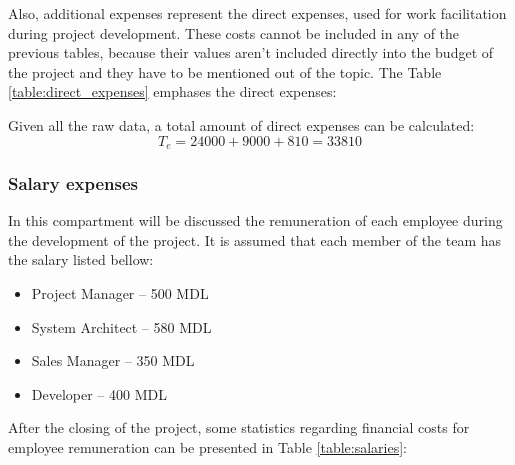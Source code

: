 Also, additional expenses represent the direct expenses, used for work facilitation during project development. These costs cannot be included in any of the previous tables, because their values aren't included directly into the budget of the project and they have to be mentioned out of the topic. The Table \ref{table:direct_expenses} emphases the direct expenses:

\begin{table}[H]
\centering
\caption{Direct expenses}
\label{table:direct_expenses}
\end{table}

Given all the raw data, a total amount of direct expenses can be calculated: 
\begin{equation}
 T_{e} = 24000 + 9000 + 810 = 33810
\end{equation}

\subsubsection{Salary expenses}
In this compartment will be discussed the remuneration of each employee during the development of the project. It is assumed that each member of the team has the salary listed bellow:

\begin{itemize}
\item Project Manager – 500 MDL
\item System Architect – 580 MDL
\item Sales Manager – 350 MDL
\item Developer – 400 MDL
\end{itemize}

After the closing of the project, some statistics regarding financial costs for employee remuneration can be presented in Table \ref{table:salaries}:

